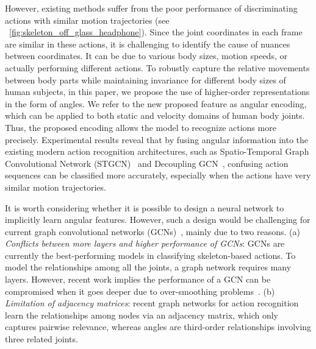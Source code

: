 \documentclass[journal,comsoc]{IEEEtran}
\begin{document}
However, existing methods suffer from the poor performance of discriminating actions with similar motion trajectories (see ~\autoref{fig:skeleton_off_glass_headphone}).
Since the joint coordinates in each frame are similar in these actions, it is challenging to identify the cause of nuances between coordinates. It can be due to various body sizes, motion speeds, or actually performing different actions. 
To robustly capture the relative movements between body parts while maintaining invariance for different body sizes of human subjects, in this paper, we propose the use of higher-order representations in the form of angles. We refer to the new proposed feature as angular encoding, which can be applied to both static and velocity domains of human body joints. 
Thus, the proposed encoding allows the model to recognize actions more precisely.
Experimental results reveal that by fusing angular information into the existing modern action recognition architectures, such as Spatio-Temporal Graph Convolutional Network (STGCN)~\cite{yan2018spatial} and Decoupling GCN~\cite{chengdecoupling}, confusing action sequences can be classified more accurately, especially when the actions have very similar motion trajectories. 

It is worth considering whether it is possible to design a neural network to implicitly learn angular features. 
However, such a design would be challenging for current graph convolutional networks (GCNs)~\cite{wu2020comprehensive,velivckovic2017graph}, mainly due to two reasons. (a) \textit{Conflicts between more layers and higher performance of GCNs}: GCNs are currently the best-performing models in classifying skeleton-based actions. To model the relationships among all the joints, a graph network requires many layers. However, recent work implies the performance of a GCN can be compromised when it goes deeper
due to over-smoothing problems~\cite{min2020scattering}. (b)
\textit{
Limitation of adjacency matrices}: recent graph networks for action recognition learn the relationships among nodes via an adjacency matrix, which only captures pairwise relevance, whereas angles are third-order relationships involving three related joints.    
\end{document}
